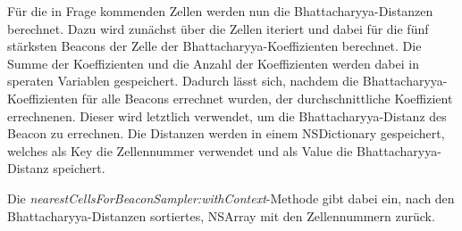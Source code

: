 Für die in Frage kommenden Zellen werden nun die Bhattacharyya-Distanzen berechnet. Dazu wird zunächst über die Zellen iteriert und dabei für die fünf stärksten Beacons der Zelle der Bhattacharyya-Koeffizienten berechnet. Die Summe der Koeffizienten und die Anzahl der Koeffizienten werden dabei in  speraten Variablen gespeichert. Dadurch lässt sich, nachdem die Bhattacharyya-Koeffizienten für alle Beacons errechnet wurden, der durchschnittliche Koeffizient errechnenen. Dieser wird letztlich verwendet, um die Bhattacharyya-Distanz des Beacon zu errechnen. Die Distanzen werden in einem NSDictionary gespeichert, welches als Key die Zellennummer verwendet und als Value die Bhattacharyya-Distanz speichert.

Die \emph{nearestCellsForBeaconSampler:withContext}-Methode gibt dabei ein, nach den Bhattacharyya-Distanzen sortiertes, NSArray mit den Zellennummern zurück. 




